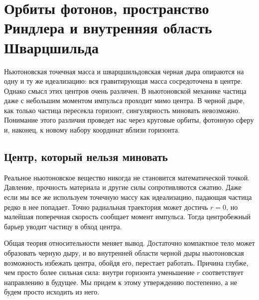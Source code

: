 \chapter{Орбиты фотонов, пространство Риндлера и внутренняя область Шварцшильда}

Ньютоновская точечная масса и шварцшильдовская черная дыра опираются на одну и ту же идеализацию: вся гравитирующая масса сосредоточена в центре. Однако смысл этих центров очень различен. В ньютоновской механике частица даже с небольшим моментом импульса проходит мимо центра. В черной дыре, как только частица пересекла горизонт, сингулярность миновать невозможно. Понимание этого различия проведет нас через круговые орбиты, фотонную сферу и, наконец, к новому набору координат вблизи горизонта.

\section{Центр, который нельзя миновать}

Реальное ньютоновское вещество никогда не становится математической точкой. Давление, прочность материала и другие силы сопротивляются сжатию. Даже если мы все же используем точечную массу как идеализацию, падающая частица редко в нее попадает. Точно радиальная траектория может достичь \(r=0\), но малейшая поперечная скорость сообщает момент импульса. Тогда центробежный барьер уводит частицу в обход центра.

Общая теория относительности меняет вывод. Достаточно компактное тело может образовать черную дыру, и во внутренней области черной дыры ньютоновская возможность избежать центра, обойдя его, перестает работать. Причина глубже, чем просто более сильная сила: внутри горизонта уменьшение \(r\) соответствует направлению в будущее. Мы придем к этому утверждению постепенно, а не будем просто исходить из него.

\begin{classroomqa}   \end{classroomqa}

